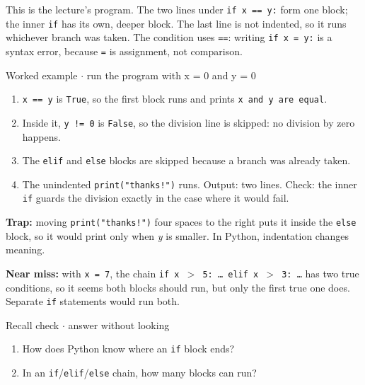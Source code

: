 \documentclass[11pt]{article}
\begin{document}
\begin{keepsection}
This is the lecture’s program. The two lines under \texttt{if x == y:} form one block; the inner \texttt{if} has its own, deeper block. The last line is not indented, so it runs whichever branch was taken. The condition uses \texttt{==}: writing \texttt{if x = y:} is a syntax error, because \texttt{=} is assignment, not comparison.

\begin{workedbox}{Worked example \ensuremath{\cdot} run the program with x = 0 and y = 0}
\begin{enumerate}
\item \texttt{x == y} is \texttt{True}, so the first block runs and prints \texttt{x and y are equal}.
\item Inside it, \texttt{y != 0} is \texttt{False}, so the division line is skipped: no division by zero happens.
\item The \texttt{elif} and \texttt{else} blocks are skipped because a branch was already taken.
\item The unindented \texttt{print("thanks!")} runs. Output: two lines. Check: the inner \texttt{if} guards the division exactly in the case where it would fail.
\end{enumerate}
\end{workedbox}

\begin{notebox}\textbf{Trap:} moving \texttt{print("thanks!")} four spaces to the right puts it inside the \texttt{else} block, so it would print only when \textit{y} is smaller. In Python, indentation changes meaning.\end{notebox}

\begin{notebox}\textbf{Near miss:} with \texttt{x = 7}, the chain \texttt{if x \ensuremath{>} 5: … elif x \ensuremath{>} 3: …} has two true conditions, so it seems both blocks should run, but only the first true one does. Separate \texttt{if} statements would run both.\end{notebox}

\begin{recallbox}{Recall check \ensuremath{\cdot} answer without looking}
\begin{enumerate}
\item How does Python know where an \texttt{if} block ends?
\item In an \texttt{if}/\texttt{elif}/\texttt{else} chain, how many blocks can run?
\end{enumerate}

\end{recallbox}
\end{keepsection}
\end{document}
